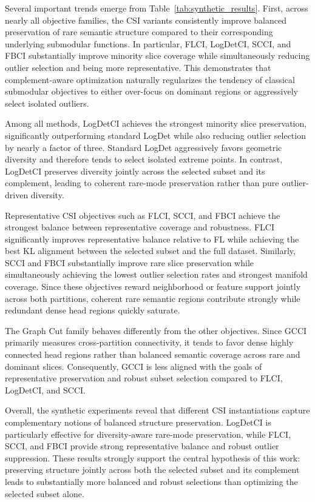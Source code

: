 \documentclass[11pt]{article}
\begin{document}
Several important trends emerge from Table~\ref{tab:synthetic_results}. First, across nearly all objective families, the CSI variants consistently improve balanced preservation of rare semantic structure compared to their corresponding underlying submodular functions. In particular, FLCI, LogDetCI, SCCI, and FBCI substantially improve minority slice coverage while simultaneously reducing outlier selection and being more representative. This demonstrates that complement-aware optimization naturally regularizes the tendency of classical submodular objectives to either over-focus on dominant regions or aggressively select isolated outliers.

Among all methods, LogDetCI achieves the strongest minority slice preservation, significantly outperforming standard LogDet while also reducing outlier selection by nearly a factor of three. Standard LogDet aggressively favors geometric diversity and therefore tends to select isolated extreme points. In contrast, LogDetCI preserves diversity jointly across the selected subset and its complement, leading to coherent rare-mode preservation rather than pure outlier-driven diversity.

Representative CSI objectives such as FLCI, SCCI, and FBCI achieve the strongest balance between representative coverage and robustness. FLCI significantly improves representative balance relative to FL while achieving the best KL alignment between the selected subset and the full dataset. Similarly, SCCI and FBCI substantially improve rare slice preservation while simultaneously achieving the lowest outlier selection rates and strongest manifold coverage. Since these objectives reward neighborhood or feature support jointly across both partitions, coherent rare semantic regions contribute strongly while redundant dense head regions quickly saturate.

The Graph Cut family behaves differently from the other objectives. Since GCCI primarily measures cross-partition connectivity, it tends to favor dense highly connected head regions rather than balanced semantic coverage across rare and dominant slices. Consequently, GCCI is less aligned with the goals of representative preservation and robust subset selection compared to FLCI, LogDetCI, and SCCI.

Overall, the synthetic experiments reveal that different CSI instantiations capture complementary notions of balanced structure preservation. LogDetCI is particularly effective for diversity-aware rare-mode preservation, while FLCI, SCCI, and FBCI provide strong representative balance and robust outlier suppression. These results strongly support the central hypothesis of this work: preserving structure jointly across both the selected subset and its complement leads to substantially more balanced and robust selections than optimizing the selected subset alone.
\end{document}
